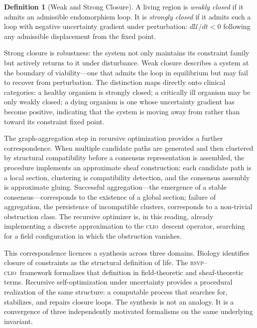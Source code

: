 \documentclass[11pt, a4paper]{article}
\theoremstyle{plain}
\theoremstyle{definition}
\newtheorem{definition}[theorem]{Definition}
\theoremstyle{remark}
\newcommand{\CLIO}{\textsc{clio}}
\newcommand{\RSVP}{\textsc{rsvp}}
\begin{document}
\begin{definition}[Weak and Strong Closure]
A living region is \emph{weakly closed} if it admits an admissible endomorphism loop. It is \emph{strongly closed} if it admits such a loop with negative uncertainty gradient under perturbation: $d\mathcal{U}/dt < 0$ following any admissible displacement from the fixed point.
\end{definition}

Strong closure is robustness: the system not only maintains its constraint family but actively returns to it under disturbance. Weak closure describes a system at the boundary of viability---one that admits the loop in equilibrium but may fail to recover from perturbation. The distinction maps directly onto clinical categories: a healthy organism is strongly closed; a critically ill organism may be only weakly closed; a dying organism is one whose uncertainty gradient has become positive, indicating that the system is moving away from rather than toward its constraint fixed point.

The graph-aggregation step in recursive optimization provides a further correspondence. When multiple candidate paths are generated and then clustered by structural compatibility before a consensus representation is assembled, the procedure implements an approximate sheaf construction: each candidate path is a local section, clustering is compatibility detection, and the consensus assembly is approximate gluing. Successful aggregation---the emergence of a stable consensus---corresponds to the existence of a global section; failure of aggregation, the persistence of incompatible clusters, corresponds to a non-trivial obstruction class. The recursive optimizer is, in this reading, already implementing a discrete approximation to the \CLIO\ descent operator, searching for a field configuration in which the obstruction vanishes.

This correspondence licences a synthesis across three domains. Biology identifies closure of constraints as the structural definition of life. The \RSVP--\CLIO\ framework formalizes that definition in field-theoretic and sheaf-theoretic terms. Recursive self-optimization under uncertainty provides a procedural realization of the same structure: a computable process that searches for, stabilizes, and repairs closure loops. The synthesis is not an analogy. It is a convergence of three independently motivated formalisms on the same underlying invariant.
\end{document}

